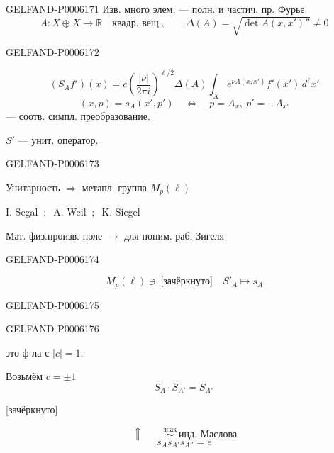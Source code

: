 \begin{GelfandAdjacentEvidence}{GELFAND-P000617}{1}
Изв. много элем. — полн. и частич. пр. Фурье.
\[
A:X\oplus X\longrightarrow\mathbb R\quad\text{квадр. вещ.},
\qquad \Delta(A)=\sqrt{\det A(x,x')''}\ne0
\]
\end{GelfandAdjacentEvidence}
\begin{GelfandAdjacentEvidence}{GELFAND-P000617}{2}

\[
(S_Af')(x)=c\left(\frac{|\nu|}{2\pi i}\right)^{\ell/2}\Delta(A)
\int_Xe^{\nu A(x,x')}f'(x')\,d^\ell x'
\]
\[
(x,p)=s_A(x',p')\quad\Leftrightarrow\quad p=A_x,\ p'=-A_{x'}
\]
— соотв. симпл. преобразование.

\(S'\) — унит. оператор.
\end{GelfandAdjacentEvidence}
\begin{GelfandAdjacentEvidence}{GELFAND-P000617}{3}

Унитарность \(\Rightarrow\) метапл. группа \(M_p(\ell)\)

I. Segal \(\ ;\ \) A. Weil \(\ ;\ \) K. Siegel

Мат. физ.\qquad произв. поле \(\longrightarrow\) для поним. раб. Зигеля
\end{GelfandAdjacentEvidence}
\begin{GelfandAdjacentEvidence}{GELFAND-P000617}{4}


\[
M_p(\ell)\ni\ \text{[зачёркнуто]}\quad S'_A\longmapsto s_A
\]
\end{GelfandAdjacentEvidence}
\begin{GelfandAdjacentEvidence}{GELFAND-P000617}{5}

\end{GelfandAdjacentEvidence}
\begin{GelfandAdjacentEvidence}{GELFAND-P000617}{6}

это ф-ла с \(|c|=1\).

Возьмём \(c=\pm1\)
\[
S_A\cdot S_{A'}=S_{A''}
\]
\begin{center}
[зачёркнуто]\quad{}
\end{center}
\[
\Uparrow\qquad \overset{\text{знак}}{\sim}\ \text{инд. Маслова}
\]
\[
s_A s_{A'} s_{A''}=e
\]
\end{GelfandAdjacentEvidence}
